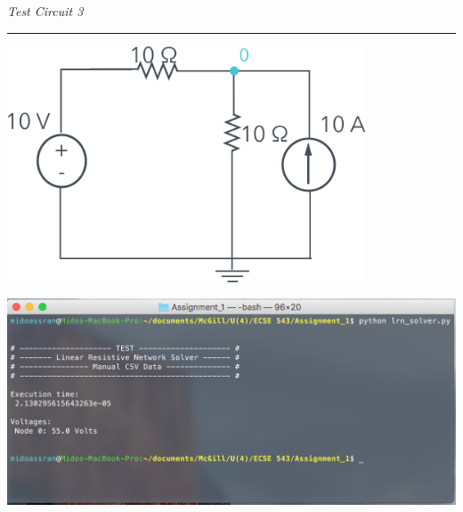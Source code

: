\documentclass[11pt]{amsart}
\begin{document}
\begin{minipage}{\textwidth}
    \textit{Test Circuit 3}\\
    \noindent\rule[0.5ex]{\linewidth}{0.5pt}
\end{minipage}
\begin{minipage}{0.3\textwidth}
\end{minipage}
\begin{minipage}{0.7\textwidth}
	\begin{center}
		\vspace{2em}
        		\includegraphics[width=0.8\textwidth]{assets/sk_test_c3.png}
	\end{center}
\end{minipage}
\begin{minipage}{\textwidth}
	\vspace{2em}
	\centering
	\includegraphics[width=\textwidth]{assets/test_c3.png}
\end{minipage}
\pagebreak
\end{document}
